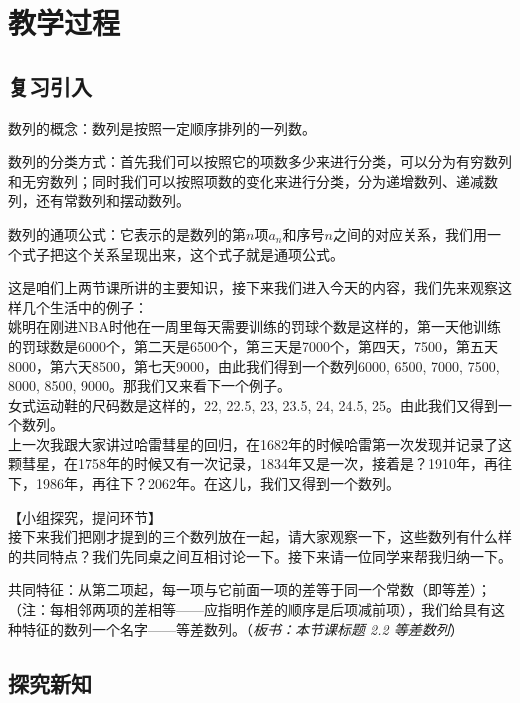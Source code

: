\documentclass[10pt,a4paper]{article}
\begin{document}
	\section{教学过程}

		\subsection{复习引入} %
		\label{sub:复习引入}
		
			数列的概念：数列是按照一定顺序排列的一列数。

			数列的分类方式：首先我们可以按照它的项数多少来进行分类，可以分为有穷数列和无穷数列；同时我们可以按照项数的变化来进行分类，分为递增数列、递减数列，还有常数列和摆动数列。

			数列的通项公式：它表示的是数列的第$n$项$a_n$和序号$n$之间的对应关系，我们用一个式子把这个关系呈现出来，这个式子就是通项公式。

			这是咱们上两节课所讲的主要知识，接下来我们进入今天的内容，我们先来观察这样几个生活中的例子：\\
			姚明在刚进NBA时他在一周里每天需要训练的罚球个数是这样的，第一天他训练的罚球数是6000个，第二天是6500个，第三天是7000个，第四天，7500，第五天8000，第六天8500，第七天9000，由此我们得到一个数列6000, 6500, 7000, 7500, 8000, 8500, 9000。那我们又来看下一个例子。\\
			女式运动鞋的尺码数是这样的，22, 22.5, 23, 23.5, 24, 24.5, 25。由此我们又得到一个数列。\\
			上一次我跟大家讲过哈雷彗星的回归，在1682年的时候哈雷第一次发现并记录了这颗彗星，在1758年的时候又有一次记录，1834年又是一次，接着是？1910年，再往下，1986年，再往下？2062年。在这儿，我们又得到一个数列。

			【小组探究，提问环节】\\
			接下来我们把刚才提到的三个数列放在一起，请大家观察一下，这些数列有什么样的共同特点？我们先同桌之间互相讨论一下。接下来请一位同学来帮我归纳一下。

			共同特征：从第二项起，每一项与它前面一项的差等于同一个常数（即等差）；（注：每相邻两项的差相等——应指明作差的顺序是后项减前项），我们给具有这种特征的数列一个名字——等差数列。（\emph{板书：本节课标题 2.2 等差数列}）

		\subsection{探究新知} %
		\label{sub:探究新知}
		
\end{document}
